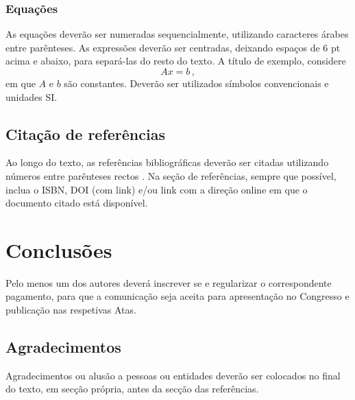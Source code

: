 \documentclass[11pt, a4paper, twoside]{article}
\begin{document}
\subsubsection{Equações}

As equações deverão ser numeradas sequencialmente, utilizando caracteres árabes entre parênteses. As expressões deverão ser centradas, deixando espaços de 6 pt acima e abaixo, para separá-las do resto do texto. A título de exemplo, considere 
%
\begin{equation}
Ax = b \,,
\label{eq:eq1}
\end{equation}
%
em que $A$ e $b$ são constantes. Deverão ser utilizados símbolos convencionais e unidades SI. 


\subsection{Citação de referências}

Ao longo do texto, as referências bibliográficas deverão ser citadas utilizando números entre parênteses rectos \cite{Fonseca-2013,ref2,TADEU2006,ref4,refBranco,ref6,Brebbia}. Na seção de referências, sempre que possível, inclua o ISBN, DOI (com link) e/ou link com a direção online em que o documento citado está disponível.

\section{Conclusões}

Pelo menos um dos autores deverá inscrever se e regularizar o correspondente pagamento, para que a comunicação seja aceita para apresentação no Congresso e publicação nas respetivas Atas.

\subsection*{Agradecimentos}

Agradecimentos ou alusão a pessoas ou entidades deverão ser colocados no final do texto, em secção própria, antes da secção das referências.

\renewcommand{\refname}{Referências} 


\end{document}
